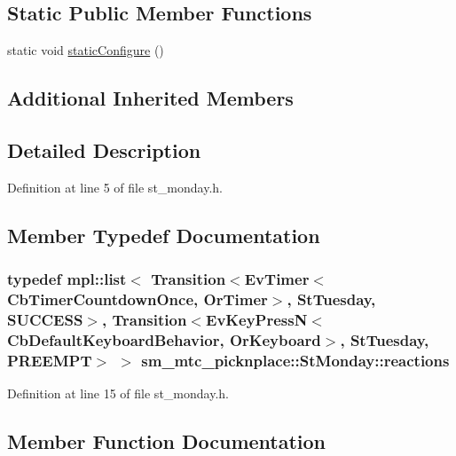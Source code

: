 \subsection*{Static Public Member Functions}
\begin{DoxyCompactItemize}
\item 
static void \hyperlink{structsm__mtc__picknplace_1_1StMonday_ad4a28f156acb533493b3572ca07dd91b}{static\+Configure} ()
\end{DoxyCompactItemize}
\subsection*{Additional Inherited Members}


\subsection{Detailed Description}


Definition at line 5 of file st\+\_\+monday.\+h.



\subsection{Member Typedef Documentation}
\subsubsection[{\texorpdfstring{reactions}{reactions}}]{\setlength{\rightskip}{0pt plus 5cm}typedef mpl\+::list$<$ Transition$<$Ev\+Timer$<$Cb\+Timer\+Countdown\+Once, {\bf Or\+Timer}$>$, {\bf St\+Tuesday}, {\bf S\+U\+C\+C\+E\+SS}$>$, Transition$<$Ev\+Key\+PressN$<$Cb\+Default\+Keyboard\+Behavior, {\bf Or\+Keyboard}$>$, {\bf St\+Tuesday}, {\bf P\+R\+E\+E\+M\+PT}$>$ $>$ {\bf sm\+\_\+mtc\+\_\+picknplace\+::\+St\+Monday\+::reactions}}\hypertarget{structsm__mtc__picknplace_1_1StMonday_ad6381a247c375a8150eee43d7569e479}{}\label{structsm__mtc__picknplace_1_1StMonday_ad6381a247c375a8150eee43d7569e479}


Definition at line 15 of file st\+\_\+monday.\+h.



\subsection{Member Function Documentation}
